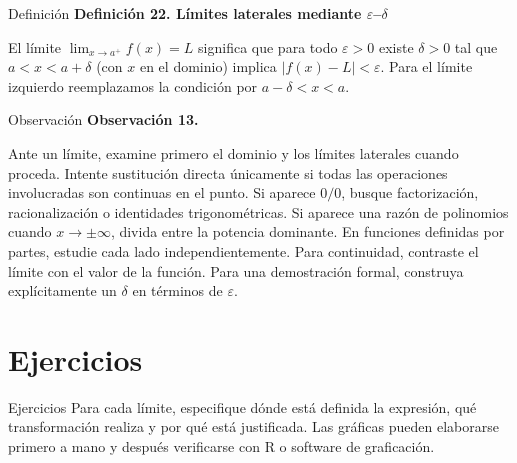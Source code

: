 \documentclass[12pt,aspectratio=169]{beamer}
\begin{document}
\begin{frame}[t,allowframebreaks]{Definición}
{\color{azul}\bfseries Definición 22. Límites laterales mediante $\varepsilon$--$\delta$}\par\medskip

El límite $\lim_{x\to a^+}f(x)=L$ significa que para todo $\varepsilon>0$ existe $\delta>0$ tal que $a<x<a+\delta$ (con $x$ en el dominio) implica $|f(x)-L|<\varepsilon$. Para el límite izquierdo reemplazamos la condición por $a-\delta<x<a$.
\end{frame}


\begin{frame}[t,allowframebreaks]{Observación}
{\color{azul}\bfseries Observación 13.}\par\medskip

Ante un límite, examine primero el dominio y los límites laterales cuando proceda. Intente sustitución directa únicamente si todas las operaciones involucradas son continuas en el punto. Si aparece $0/0$, busque factorización, racionalización o identidades trigonométricas. Si aparece una razón de polinomios cuando $x\to\pm\infty$, divida entre la potencia dominante. En funciones definidas por partes, estudie cada lado independientemente. Para continuidad, contraste el límite con el valor de la función. Para una demostración formal, construya explícitamente un $\delta$ en términos de $\varepsilon$.
\end{frame}


\section{Ejercicios}

\begin{frame}[t,allowframebreaks]{Ejercicios}
Para cada límite, especifique dónde está definida la expresión, qué transformación realiza y por qué está justificada. Las gráficas pueden elaborarse primero a mano y después verificarse con R o software de graficación.
\end{frame}
\end{document}
